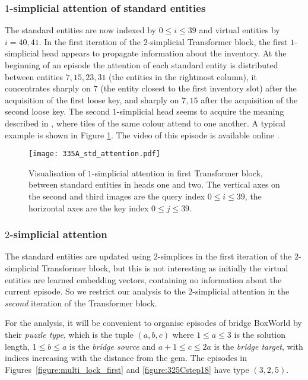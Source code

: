 \documentclass{article} %
\begin{document}
\subsubsection{$1$-simplicial attention of standard entities}

The standard entities are now indexed by $0 \le i \le 39$ and virtual entities by $i = 40,41$. In the first iteration of the $2$-simplicial Transformer block, the first $1$-simplicial head appears to propagate information about the inventory. At the beginning of an episode the attention of each standard entity is distributed between entities $7,15,23,31$ (the entities in the rightmost column), it concentrates sharply on $7$ (the entity closest to the first inventory slot) after the acquisition of the first loose key, and sharply on $7, 15$ after the acquisition of the second loose key. The second $1$-simplicial head seems to acquire the meaning described in \citep{zambaldi}, where tiles of the same colour attend to one another. A typical example is shown in Figure \ref{figure:335A_std}. The video of this episode is available online \citep{repo}.

\begin{figure}[h]
\begin{center}
\texttt{[image: 335A\_std\_attention.pdf]}
\end{center}
\caption{Visualisation of $1$-simplicial attention in first Transformer block, between standard entities in heads one and two. The vertical axes on the second and third images are the query index $0 \le i \le 39$, the horizontal axes are the key index $0 \le j \le 39$.}
\label{figure:335A_std}
\end{figure}




\subsubsection{$2$-simplicial attention}

The standard entities are updated using $2$-simplices in the first iteration of the $2$-simplicial Transformer block, but this is not interesting as initially the virtual entities are learned embedding vectors, containing no information about the current episode. So we restrict our analysis to the $2$-simplicial attention in the \emph{second} iteration of the Transformer block. 

For the analysis, it will be convenient to organise episodes of bridge BoxWorld by their \emph{puzzle type}, which is the tuple $(a,b,c)$ where $1 \le a \le 3$ is the solution length, $1 \le b \le a$ is the \emph{bridge source} and $a + 1 \le c \le 2a$ is the \emph{bridge target}, with indices increasing with the distance from the gem. The episodes in Figures~\ref{figure:multi_lock_first} and \ref{figure:325Cstep18} have type $(3,2,5)$.
\end{document}
